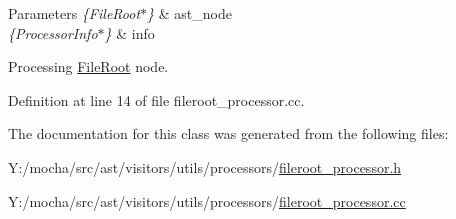 \begin{DoxyParams}{Parameters}
{\em \{FileRoot$\ast$\}} & ast\_\-node \\
\hline
{\em \{ProcessorInfo$\ast$\}} & info\\
\hline
\end{DoxyParams}
Processing \hyperlink{classmocha_1_1_file_root}{FileRoot} node. 

Definition at line 14 of file fileroot\_\-processor.cc.



The documentation for this class was generated from the following files:\begin{DoxyCompactItemize}
\item 
Y:/mocha/src/ast/visitors/utils/processors/\hyperlink{fileroot__processor_8h}{fileroot\_\-processor.h}\item 
Y:/mocha/src/ast/visitors/utils/processors/\hyperlink{fileroot__processor_8cc}{fileroot\_\-processor.cc}\end{DoxyCompactItemize}
